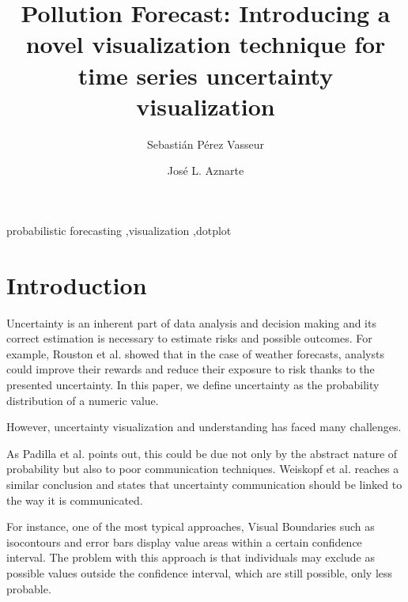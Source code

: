 \documentclass[a4paper,3p,sort&compress]{elsarticle}
\begin{document}
\linenumbers

\newcommand{\no}{NO\textsubscript{2}\xspace}

\begin{frontmatter}

  \title{Pollution Forecast: Introducing a novel visualization technique for time series uncertainty visualization}


  \author{Sebasti\'an P\'erez Vasseur}
  \author{Jos\'e L. Aznarte}
  \address{Artificial Intelligence Department\\Universidad Nacional de
    Educaci\'on a Distancia --- UNED\\c/ Juan del Rosal, 16, Madrid, Spain}
  

\begin{abstract}
  
\end{abstract}

\begin{keyword}
probabilistic forecasting \sep visualization \sep dotplot
\end{keyword}

\end{frontmatter}


\section{Introduction}
\label{sec:intro}

Uncertainty is an inherent part of data analysis and decision making and its correct estimation 
is necessary to estimate risks and possible outcomes. For example, Rouston et al. showed that 
in the case of weather forecasts, analysts could improve their rewards and reduce their exposure 
to risk thanks to the presented uncertainty. In this paper, we define uncertainty as the probability 
distribution of a numeric value.

However, uncertainty visualization and understanding has faced many challenges. 

As Padilla et al. points out, this could be due not only by the abstract nature of probability 
but also to poor communication techniques. Weiskopf et al. reaches a similar conclusion and states 
that uncertainty communication should be linked to the way it is communicated.

For instance, one of the most typical approaches, Visual Boundaries such as isocontours and error 
bars display value areas within a certain  confidence interval. The problem with this approach is 
that individuals may exclude as possible values outside the confidence interval, which are still 
possible, only less probable. 
\end{document}
